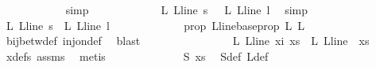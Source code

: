 \begin{isabellebody}
\ \ \ \ \ \ \ \ \ \ \isamarkupfalse%
\ simp\isanewline
\ \ \ \ \ \ \ \ \isamarkupfalse%
\ \isamarkupfalse%
\ {\isachardoublequoteopen}{\isasymphi}\ {\isacharparenleft}{\kern0pt}{\isasymchi}L\ {\isacharparenleft}{\kern0pt}L{\isacharunderscore}{\kern0pt}line\ s{\isacharparenright}{\kern0pt}{\isacharparenright}{\kern0pt}\ {\isacharequal}{\kern0pt}\ {\isasymphi}\ {\isacharparenleft}{\kern0pt}{\isasymchi}L\ {\isacharparenleft}{\kern0pt}L{\isacharunderscore}{\kern0pt}line\ l{\isacharparenright}{\kern0pt}{\isacharparenright}{\kern0pt}{\isachardoublequoteclose}\ \isamarkupfalse%
\ simp\isanewline
\ \ \ \ \ \ \ \ \isamarkupfalse%
\ \isamarkupfalse%
\ {\isachardoublequoteopen}{\isasymchi}L\ {\isacharparenleft}{\kern0pt}L{\isacharunderscore}{\kern0pt}line\ s{\isacharparenright}{\kern0pt}\ {\isacharequal}{\kern0pt}\ {\isasymchi}L\ {\isacharparenleft}{\kern0pt}L{\isacharunderscore}{\kern0pt}line\ l{\isacharparenright}{\kern0pt}{\isachardoublequoteclose}\ \isanewline
\ \ \ \ \ \ \ \ \ \ \isamarkupfalse%
\ {\isasymphi}{\isacharunderscore}{\kern0pt}prop\ L{\isacharunderscore}{\kern0pt}line{\isacharunderscore}{\kern0pt}base{\isacharunderscore}{\kern0pt}prop\ L{}\ L{}\ \isamarkupfalse%
\ bij{\isacharunderscore}{\kern0pt}betw{\isacharunderscore}{\kern0pt}def\ inj{\isacharunderscore}{\kern0pt}on{\isacharunderscore}{\kern0pt}def\ \isamarkupfalse%
\ blast\isanewline
\ \ \ \ \ \ \isamarkupfalse%
\isanewline
\ \ \ \ \ \ \isamarkupfalse%
\ \isamarkupfalse%
\ {\isachardoublequoteopen}{\isasymchi}L\ {\isacharparenleft}{\kern0pt}L{\isacharunderscore}{\kern0pt}line\ xi{\isacharparenright}{\kern0pt}\ xs\ {\isacharequal}{\kern0pt}\ {\isasymchi}L\ {\isacharparenleft}{\kern0pt}L{\isacharunderscore}{\kern0pt}line\ {}{\isacharparenright}{\kern0pt}\ xs{\isachardoublequoteclose}\ \isamarkupfalse%
\ xdefs\ assms{\isacharparenleft}{\kern0pt}{}{\isacharparenright}{\kern0pt}\ \isamarkupfalse%
\ metis\isanewline
\ \ \ \ \ \ \isamarkupfalse%
\ \isamarkupfalse%
\ {\isachardoublequoteopen}\ {\isachardot}{\kern0pt}{\isachardot}{\kern0pt}{\isachardot}{\kern0pt}\ {\isacharequal}{\kern0pt}\ \ {\isasymchi}S\ xs{\isachardoublequoteclose}\ \isamarkupfalse%
\ {\isasymchi}S{\isacharunderscore}{\kern0pt}def\ {\isasymchi}L{\isacharunderscore}{\kern0pt}def\ \isamarkupfalse%

\end{isabellebody}
